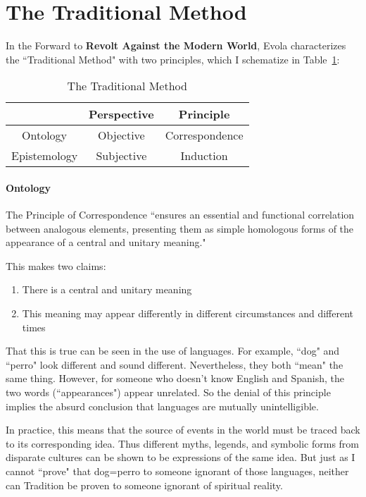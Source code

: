 \section{The Traditional Method}

In the Forward to \textbf{Revolt Against the Modern World}, Evola characterizes the ``Traditional Method" with two principles, which I schematize in Table~\ref{tab:TraditionalMethod}:

\begin{table}[h]\centering\small
\begin{tabular}{ccc}\toprule
&
\textbf{Perspective} &
\textbf{Principle}\\\midrule
Ontology &
Objective &
Correspondence\\\midrule
Epistemology &
Subjective &
Induction\\\bottomrule
\end{tabular}
\caption{The Traditional Method}
\label{tab:TraditionalMethod}
\end{table}
\paragraph{Ontology}
The Principle of Correspondence ``ensures an essential and functional correlation between analogous elements, presenting them as simple homologous forms of the appearance of a central and unitary meaning." 

This makes two claims:

\begin{enumerate}
\item There is a central and unitary meaning 
\item This meaning may appear differently in different circumstances and different times 
\end{enumerate}
That this is true can be seen in the use of languages. For example, ``dog" and ``perro" look different and sound different. Nevertheless, they both ``mean" the same thing. However, for someone who doesn't know English and Spanish, the two words (``appearances") appear unrelated. So the denial of this principle implies the absurd conclusion that languages are mutually unintelligible. 

In practice, this means that the source of events in the world must be traced back to its corresponding idea. Thus different myths, legends, and symbolic forms from disparate cultures can be shown to be expressions of the same idea. But just as I cannot ``prove" that dog=perro to someone ignorant of those languages, neither can Tradition be proven to someone ignorant of spiritual reality. 

